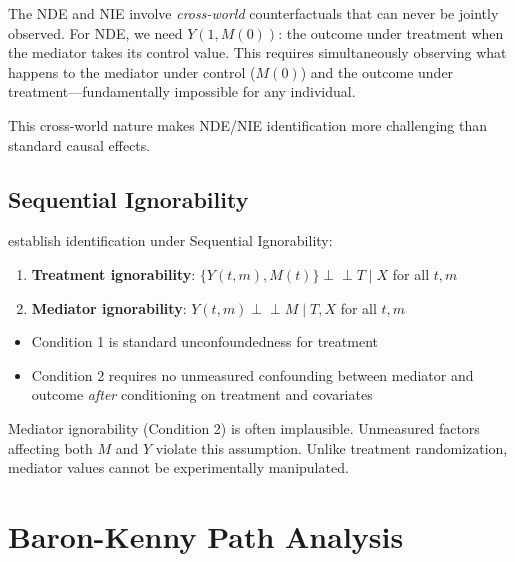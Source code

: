 \begin{insight}
The NDE and NIE involve \textit{cross-world} counterfactuals that can never be jointly observed. For NDE, we need $Y(1, M(0))$: the outcome under treatment when the mediator takes its control value. This requires simultaneously observing what happens to the mediator under control ($M(0)$) and the outcome under treatment---fundamentally impossible for any individual.
\end{insight}

This cross-world nature makes NDE/NIE identification more challenging than standard causal effects.

\subsection{Sequential Ignorability}

\textcite{imai2010general} establish identification under Sequential Ignorability:

\begin{assumption}
\label{ass:seq-ignorability}
\begin{enumerate}
\item \textbf{Treatment ignorability}: $\{Y(t,m), M(t)\} \perp\!\!\!\perp T \mid X$ for all $t, m$
\item \textbf{Mediator ignorability}: $Y(t,m) \perp\!\!\!\perp M \mid T, X$ for all $t, m$
\end{enumerate}
\end{assumption}

\begin{itemize}
\item Condition 1 is standard unconfoundedness for treatment
\item Condition 2 requires no unmeasured confounding between mediator and outcome \textit{after} conditioning on treatment and covariates
\end{itemize}

\begin{warning}
Mediator ignorability (Condition 2) is often implausible. Unmeasured factors affecting both $M$ and $Y$ violate this assumption. Unlike treatment randomization, mediator values cannot be experimentally manipulated.
\end{warning}


\section{Baron-Kenny Path Analysis}

